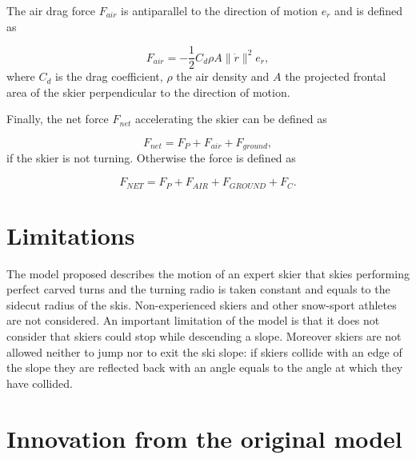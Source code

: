 \documentclass[12pt,a4paper,twoside]{book}
\newcommand{\norm}[1]{\lVert#1\rVert}
\begin{document}
The air drag force $F_{air}$ is antiparallel to the direction of motion $e_{\dot{r}}$ and is defined as

\begin{equation}
F_{air}=-\frac{1}{2}C_d \rho A \norm{\dot{r}}^2 e_{\dot{r}},
\end{equation}
where $C_d$ is the drag coefficient, $\rho$ the air density and $A$ the projected frontal area of the skier perpendicular to the direction of motion.

Finally, the net force $F_{net}$ accelerating the skier can be defined as

\begin{equation}
F_{net}=F_P + F_{air} + F_{ground},
\end{equation}
if the skier is not turning. Otherwise the force is defined as

\begin{equation}\label{physical_resultant}
F_{NET}=F_P + F_{AIR} + F_{GROUND} + F_C.
\end{equation}

\section{Limitations}
The model proposed describes the motion of an expert skier that skies performing perfect carved turns and the turning radio is taken constant and equals to the sidecut radius of the skis. Non-experienced skiers and other snow-sport athletes are not considered. An important limitation of the model is that it does not consider that skiers could stop while descending a slope. Moreover skiers are not allowed neither to jump nor to exit the ski slope: if skiers collide with an edge of the slope they are reflected back with an angle equals to the angle at which they have collided.

\section{Innovation from the original model}
\end{document}
